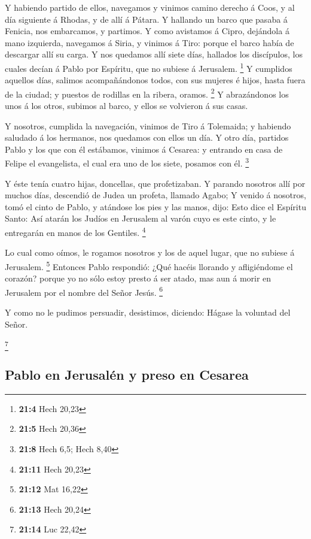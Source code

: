  Y habiendo partido de ellos, navegamos y vinimos camino
derecho á Coos, y al día siguiente á Rhodas, y de allí á Pátara.
 Y hallando un barco que pasaba á Fenicia, nos embarcamos, y
partimos.  Y como avistamos á Cipro, dejándola á mano
izquierda, navegamos á Siria, y vinimos á Tiro: porque el barco había de
descargar allí su carga.  Y nos quedamos allí siete días,
hallados los discípulos, los cuales decían á Pablo por Espíritu, que no
subiese á Jerusalem. \footnote{\textbf{21:4} Hech 20,23}  Y
cumplidos aquellos días, salimos acompañándonos todos, con sus mujeres é
hijos, hasta fuera de la ciudad; y puestos de rodillas en la ribera,
oramos. \footnote{\textbf{21:5} Hech 20,36}  Y abrazándonos
los unos á los otros, subimos al barco, y ellos se volvieron á sus
casas.

 Y nosotros, cumplida la navegación, vinimos de Tiro á
Tolemaida; y habiendo saludado á los hermanos, nos quedamos con ellos un
día.  Y otro día, partidos Pablo y los que con él estábamos,
vinimos á Cesarea: y entrando en casa de Felipe el evangelista, el cual
era uno de los siete, posamos con él. \footnote{\textbf{21:8} Hech 6,5;
  Hech 8,40}

 Y éste tenía cuatro hijas, doncellas, que profetizaban.
 Y parando nosotros allí por muchos días, descendió de
Judea un profeta, llamado Agabo;  Y venido á nosotros, tomó
el cinto de Pablo, y atándose los pies y las manos, dijo: Esto dice el
Espíritu Santo: Así atarán los Judíos en Jerusalem al varón cuyo es este
cinto, y le entregarán en manos de los Gentiles. \footnote{\textbf{21:11}
  Hech 20,23}

 Lo cual como oímos, le rogamos nosotros y los de aquel
lugar, que no subiese á Jerusalem. \footnote{\textbf{21:12} Mat 16,22}
 Entonces Pablo respondió: ¿Qué hacéis llorando y
afligiéndome el corazón? porque yo no sólo estoy presto á ser atado, mas
aun á morir en Jerusalem por el nombre del Señor Jesús. \footnote{\textbf{21:13}
  Hech 20,24}

 Y como no le pudimos persuadir, desistimos, diciendo:
Hágase la voluntad del Señor.

\footnote{\textbf{21:14} Luc 22,42}

\hypertarget{pablo-en-jerusaluxe9n-y-preso-en-cesarea}{%
\subsection{Pablo en Jerusalén y preso en
Cesarea}\label{pablo-en-jerusaluxe9n-y-preso-en-cesarea}}

